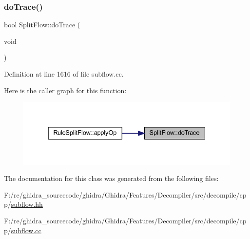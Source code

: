 \subsubsection{\texorpdfstring{doTrace()}{doTrace()}}
{\footnotesize\ttfamily bool Split\+Flow\+::do\+Trace (\begin{DoxyParamCaption}\item[{void}]{ }\end{DoxyParamCaption})}



Definition at line 1616 of file subflow.\+cc.

Here is the caller graph for this function\+:
\nopagebreak
\begin{figure}[H]
\begin{center}
\leavevmode
\includegraphics[width=331pt]{class_split_flow_a45e3612033f7082f63af36a551f64917_icgraph}
\end{center}
\end{figure}


The documentation for this class was generated from the following files\+:\begin{DoxyCompactItemize}
\item 
F\+:/re/ghidra\+\_\+sourcecode/ghidra/\+Ghidra/\+Features/\+Decompiler/src/decompile/cpp/\mbox{\hyperlink{subflow_8hh}{subflow.\+hh}}\item 
F\+:/re/ghidra\+\_\+sourcecode/ghidra/\+Ghidra/\+Features/\+Decompiler/src/decompile/cpp/\mbox{\hyperlink{subflow_8cc}{subflow.\+cc}}\end{DoxyCompactItemize}
